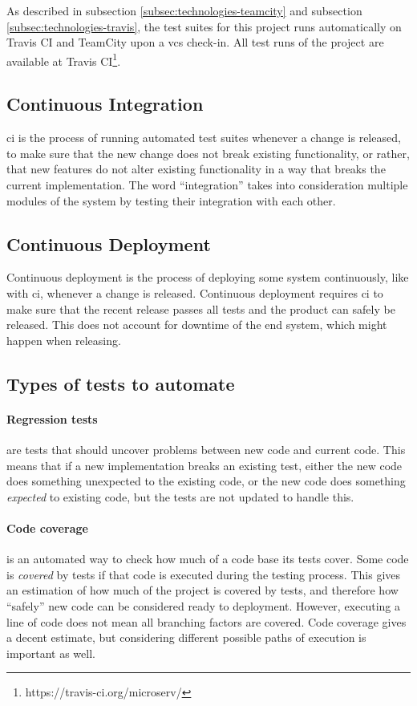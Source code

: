 As described in subsection \ref{subsec:technologies-teamcity} and subsection \ref{subsec:technologies-travis}, the test suites for this project runs automatically on Travis CI and TeamCity upon a \acrshort{vcs} check-in. All test runs of the project are available at Travis CI\footnote{https://travis-ci.org/microserv/}.

\subsection{Continuous Integration}

\acrlong{ci} is the process of running automated test suites whenever a change is released, to make sure that the new change does not break existing functionality, or rather, that new features do not alter existing functionality in a way that breaks the current implementation. The word ``integration'' takes into consideration multiple modules of the system by testing their integration with each other.

\subsection{Continuous Deployment}

Continuous deployment is the process of deploying some system continuously, like with \acrshort{ci}, whenever a change is released. Continuous deployment requires \acrshort{ci} to make sure that the recent release passes all tests and the product can safely be released. This does not account for downtime of the end system, which might happen when releasing.

\subsection{Types of tests to automate}
\paragraph{Regression tests} are tests that should uncover problems between new code and current code. This means that if a new implementation breaks an existing test, either the new code does something unexpected to the existing code, or the new code does something \textit{expected} to existing code, but the tests are not updated to handle this.

\paragraph{Code coverage} is an automated way to check how much of a code base its tests cover. Some code is \textit{covered} by tests if that code is executed during the testing process. This gives an estimation of how much of the project is covered by tests, and therefore how ``safely'' new code can be considered ready to deployment. 
However, executing a line of code does not mean all branching factors are covered. Code coverage gives a decent estimate, but considering different possible paths of execution is important as well.


